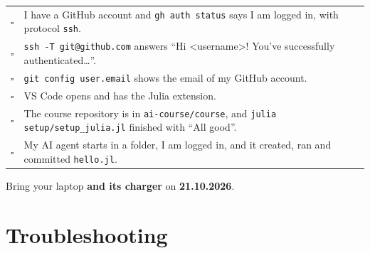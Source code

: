 \documentclass[11pt,a4paper]{article}
\newcommand{\coursedate}{\textbf{21.10.2026}}
\newcommand{\cmd}[1]{\texttt{#1}}
\begin{document}
\begin{center}
\renewcommand{\arraystretch}{1.3}
\begin{tabularx}{\textwidth}{@{}c X@{}}
$\square$ & I have a GitHub account and \cmd{gh auth status} says I am logged in, with protocol \cmd{ssh}. \\
$\square$ & \cmd{ssh -T git@github.com} answers ``Hi \textless username\textgreater! You've successfully authenticated\ldots''. \\
$\square$ & \cmd{git config user.email} shows the email of my GitHub account. \\
$\square$ & VS Code opens and has the Julia extension. \\
$\square$ & The course repository is in \cmd{ai-course/course}, and \cmd{julia setup/setup\_julia.jl} finished with ``All good''. \\
$\square$ & My AI agent starts in a folder, I am logged in, and it created, ran and committed \cmd{hello.jl}. \\
\end{tabularx}
\end{center}

Bring your laptop \textbf{and its charger} on \coursedate.

\section{Troubleshooting}\label{sec:troubleshooting}
\end{document}
